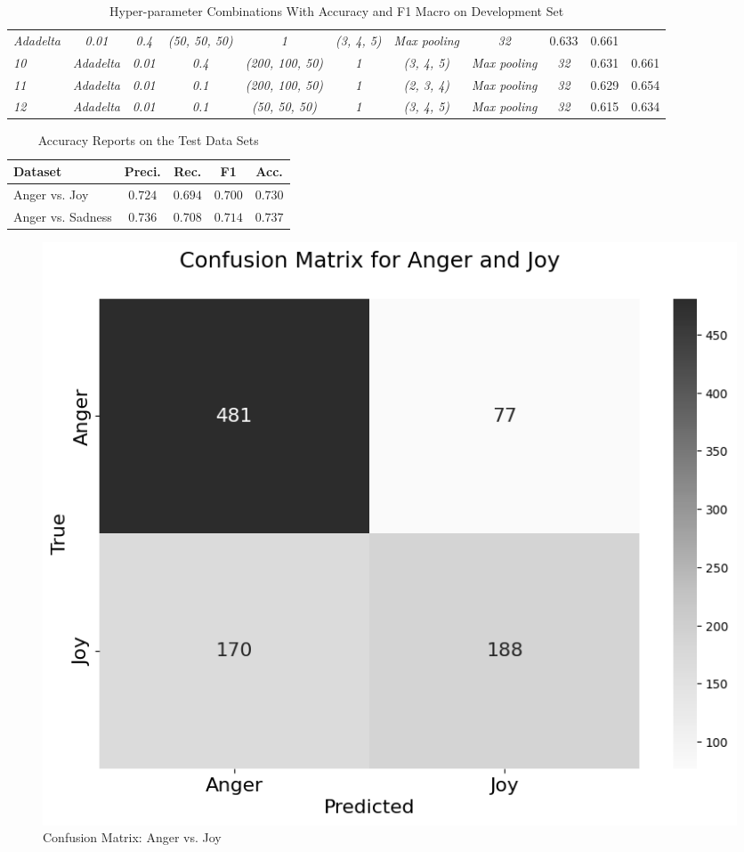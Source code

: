 \documentclass[fleqn,10pt]{SelfArx} %
\begin{document}
{\begin{table}[]
{{\begin{tabular}{l|cccccccc|rr}
  \textit{Adadelta} &
  \textit{0.01} &
  \textit{0.4} &
  \textit{(50, 50, 50)} &
  \textit{1} &
  \textit{(3, 4, 5)} &
  \textit{Max pooling} &
  \textit{32} &
  0.633 &
  0.661 \Tstrut\Bstrut \\
\textit{10} &
  \textit{Adadelta} &
  \textit{0.01} &
  \textit{0.4} &
  \textit{(200, 100, 50)} &
  \textit{1} &
  \textit{(3, 4, 5)} &
  \textit{Max pooling} &
  \textit{32} &
  0.631 &
  0.661 \Tstrut\Bstrut \\
\textit{11} &
  \textit{Adadelta} &
  \textit{0.01} &
  \textit{0.1} &
  \textit{(200, 100, 50)} &
  \textit{1} &
  \textit{(2, 3, 4)} &
  \textit{Max pooling} &
  \textit{32} &
  0.629 &
  0.654 \Tstrut\Bstrut \\
\textit{12} &
  \textit{Adadelta} &
  \textit{0.01} &
  \textit{0.1} &
  \textit{(50, 50, 50)} &
  \textit{1} &
  \textit{(3, 4, 5)} &
  \textit{Max pooling} &
  \textit{32} &
  0.615 &
  0.634 \Tstrut\Bstrut \\ \hline
\end{tabular}}}
\caption{Hyper-parameter Combinations With Accuracy and F1 Macro on Development Set}
\label{hp_combinations}
\end{table}

\begin{table}[hbt]
	\centering
	\begin{tabular}{lcccc}
		\toprule
		Dataset & Preci. & Rec. & F1 & Acc. \\
		\midrule
		  Anger vs. Joy & $0.724$ & $0.694$ & $0.700$ & $0.730$ & \\
		  Anger vs. Sadness & $0.736$ & $0.708$ & $0.714$ & $0.737$ & \\
		\bottomrule
	\end{tabular}
	\caption{Accuracy Reports on the Test Data Sets}
	\label{tab:classtab}
\end{table}

\begin{figure}[ht]\centering
	\includegraphics[width=\linewidth]{Figures/confusion_matrix_eset1.png}
	\caption{Confusion Matrix: Anger vs. Joy}
	\label{fig:cm_eset1}
\end{figure}

}
\end{document}
